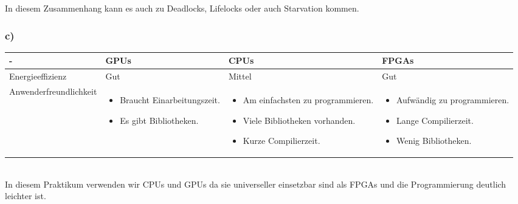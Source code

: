 \documentclass{report}
\begin{document}
        In diesem Zusammenhang kann es auch zu Deadlocks, Lifelocks oder auch Starvation kommen. 
        \subsubsection{c)}
        \begin{tabular}{|p{4cm}|p{3cm}|p{3cm}|p{3cm}|}
        	\hline
        	- & GPUs & CPUs & FPGAs \\
        	\hline
        	Energieeffizienz & Gut & Mittel & Gut  \\
        	\hline
        	Anwenderfreundlichkeit & \begin{itemize}
        		\item Braucht Einarbeitungszeit.
        		\item Es gibt Bibliotheken.
        	\end{itemize} & 
        \begin{itemize}
        	\item Am einfachsten zu programmieren.
        	\item Viele Bibliotheken vorhanden. 
        	\item Kurze Compilierzeit.
        \end{itemize}  & \begin{itemize}
        \item Aufwändig zu programmieren.
        \item Lange Compilierzeit.
        \item Wenig Bibliotheken.
    \end{itemize}  \\
        	\hline
        \end{tabular}\\
    
    In diesem Praktikum verwenden wir CPUs und GPUs da sie universeller einsetzbar sind als FPGAs und die Programmierung deutlich leichter ist.
\end{document}
